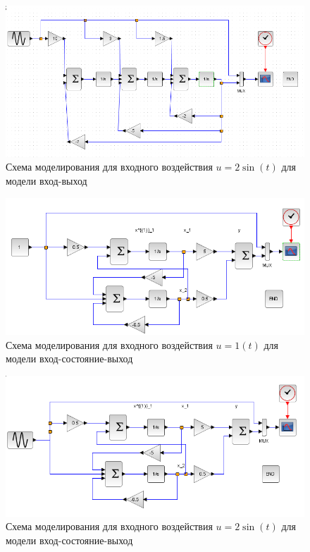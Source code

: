 \documentclass[12pt, a4paper] {ncc}
\begin{document}
		\begin{figure}[ht!]
    		\includegraphics[scale=0.5]{./modeliosin.png}
			\caption{Схема моделирования для входного воздействия $u = 2\sin(t)$ для модели вход-выход}
		\end{figure}

		\begin{figure}[ht]
    		\includegraphics[scale=0.5]{./modelios1t.png}
			\caption{Схема моделирования для входного воздействия $u = 1(t)$ для модели вход-состояние-выход}
		\end{figure}

		\begin{figure}[ht]
    		\includegraphics[scale=0.5]{./modeliossin.png}
			\caption{Схема моделирования для входного воздействия $u = 2\sin(t)$ для модели вход-состояние-выход}
		\end{figure}
\end{document}
